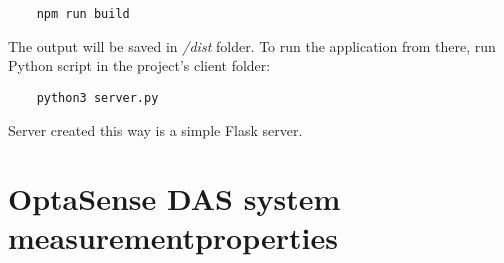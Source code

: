 \begin{verbatim}
    npm run build
\end{verbatim}

The output will be saved in \textit{/dist} folder. To run the application from there, run Python script in the project's client folder:

\begin{verbatim}
    python3 server.py
\end{verbatim}

Server created this way is a simple Flask server.

\chapter{OptaSense DAS system measurement\newline properties}\label{attach:properties}

